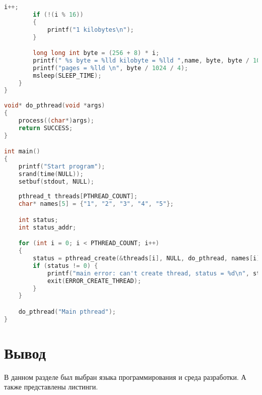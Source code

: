 \begin{lstlisting}[language=c, label=some-code, caption=Анализируемая программа]
		i++;
		if (!(i % 16))
		{
			printf("1 kilobytes\n");
		}

		long long int byte = (256 + 8) * i;
		printf(" %s byte = %lld kilobyte = %lld ",name, byte, byte / 1024);
		printf("pages = %lld \n", byte / 1024 / 4);
		msleep(SLEEP_TIME);
	}
}
	
void* do_pthread(void *args) 
{
	process((char*)args);
	return SUCCESS;
}

int main() 
{
	printf("Start program");
	srand(time(NULL));
	setbuf(stdout, NULL);
	
	pthread_t threads[PTHREAD_COUNT];
	char* names[5] = {"1", "2", "3", "4", "5"};

	int status;
	int status_addr;

	for (int i = 0; i < PTHREAD_COUNT; i++)
	{
		status = pthread_create(&threads[i], NULL, do_pthread, names[i]);
		if (status != 0) {
			printf("main error: can't create thread, status = %d\n", status);
			exit(ERROR_CREATE_THREAD);
		}
	}

	do_pthread("Main pthread"); 
}
\end{lstlisting}









\section{Вывод}

В данном разделе был выбран языка программирования и среда разработки.
А также представлены листинги.